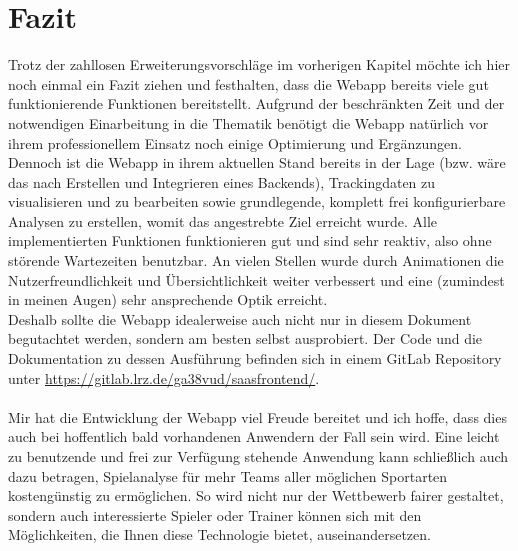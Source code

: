 \chapter{Fazit}

Trotz der zahllosen Erweiterungsvorschläge im vorherigen Kapitel möchte ich hier noch einmal ein Fazit ziehen und festhalten, dass die Webapp bereits viele gut funktionierende Funktionen bereitstellt. Aufgrund der beschränkten Zeit und der notwendigen Einarbeitung in die Thematik benötigt die Webapp natürlich vor ihrem professionellem Einsatz noch einige Optimierung und Ergänzungen. Dennoch ist die Webapp in ihrem aktuellen Stand bereits in der Lage (bzw. wäre das nach Erstellen und Integrieren eines Backends), Trackingdaten zu visualisieren und zu bearbeiten sowie grundlegende, komplett frei konfigurierbare Analysen zu erstellen, womit das angestrebte Ziel erreicht wurde. Alle implementierten Funktionen funktionieren gut und sind sehr reaktiv, also ohne störende Wartezeiten benutzbar. An vielen Stellen wurde durch Animationen die Nutzerfreundlichkeit und Übersichtlichkeit weiter verbessert und eine (zumindest in meinen Augen) sehr ansprechende Optik erreicht.
\\
Deshalb sollte die Webapp idealerweise auch nicht nur in diesem Dokument begutachtet werden, sondern am besten selbst ausprobiert. Der Code und die Dokumentation zu dessen Ausführung befinden sich in einem GitLab Repository unter \url{https://gitlab.lrz.de/ga38vud/saasfrontend/}.
\\
\\
Mir hat die Entwicklung der Webapp viel Freude bereitet und ich hoffe, dass dies auch bei hoffentlich bald vorhandenen Anwendern der Fall sein wird. Eine leicht zu benutzende und frei zur Verfügung stehende Anwendung kann schließlich auch dazu betragen, Spielanalyse für mehr Teams aller möglichen Sportarten kostengünstig zu ermöglichen. So wird nicht nur der Wettbewerb fairer gestaltet, sondern auch interessierte Spieler oder Trainer können sich mit den Möglichkeiten, die Ihnen diese Technologie bietet, auseinandersetzen.